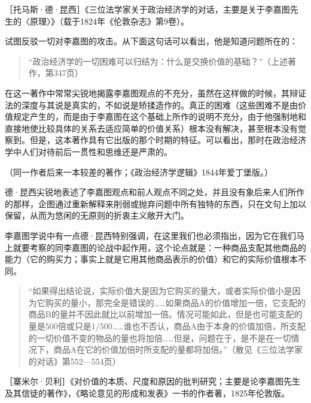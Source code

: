 
［托马斯·德·昆西］《三位法学家关于政治经济学的对话，主要是关于李嘉图先生的〈原理〉》（载于1824年《伦敦杂志》第9卷）。

试图反驳一切对李嘉图的攻击。从下面这句话可以看出，他是知道问题所在的：

\begin{quote}{“政治经济学的一切困难可以归结为：什么是交换价值的基础？”（上述著作，第347页）}\end{quote}

在这一著作中常常尖锐地揭露李嘉图观点的不充分，虽然在这样做的时候，其辩证法的深度与其说是真实的，不如说是矫揉造作的。真正的困难（这些困难不是由价值规定产生的，而是由于李嘉图在这个基础上所作的说明不充分，由于他强制地和直接地使比较具体的关系去适应简单的价值关系）根本没有解决，甚至根本没有觉察到。但是，这本著作具有它出版的那个时期的特征。可以看出，那时在政治经济学中人们对待前后一贯性和思维还是严肃的。

（同一作者后来一本较差的著作；《政治经济学逻辑》1844年爱丁堡版。）

德·昆西尖锐地表述了李嘉图观点和前人观点不同之处，并且没有象后来人们所作的那样，企图通过重新解释来削弱或抛弃问题中所有独特的东西，只在文句上加以保留，从而为悠闲的无原则的折衷主义敞开大门。

李嘉图学说中有一点德·昆西特别强调，在这里我们也必须指出，因为它在我们马上就要考察的同李嘉图的论战中起作用，这个论点就是：一种商品支配其他商品的能力（它的购买力；事实上就是它用其他商品表示的价值）和它的实际价值根本不同。

\begin{quote}{“如果得出结论说，实际价值大是因为它购买的量大，或者实际价值小是因为它购买的量小，那完全是错误的……如果商品A的价值增加一倍，它支配的商品B的量并不因此就比以前增加一倍。情况可能如此，但是也可能支配的量是500倍或只是1/500……谁也不否认，商品A由于本身的价值加倍，所支配的一切价值不变的物品的量也将加倍……但是，问题在于，是不是在一切情况下，商品A在它的价值加倍时所支配的量都将加倍。”（散见《三位法学家的对话》第552—554页）}\end{quote}



［寨米尔·贝利］《对价值的本质、尺度和原因的批判研究；主要是论李嘉图先生及其信徒的著作》，《略论意见的形成和发表》一书的作者著，1825年伦敦版。

